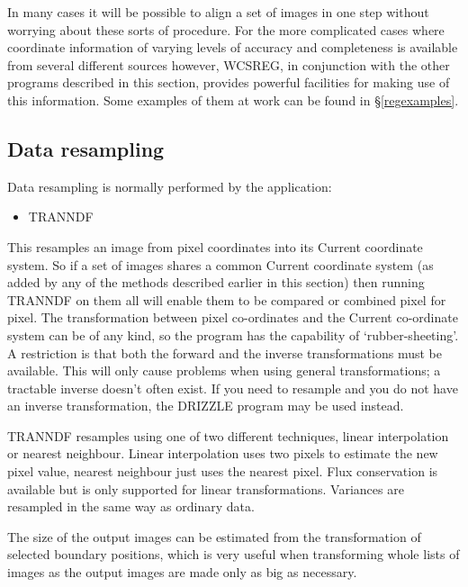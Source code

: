\documentclass[twoside,11pt]{article}
\newcommand{\hyperref}[4]{#2\ref{#4}#3}
\newcommand{\htmlref}[2]{#1}
\newcommand{\xlabel}[1]{}
\renewcommand{\_}{\texttt{\symbol{95}}}
\newcommand{\routine}[1]{{\sc #1}}
\newcommand{\xroutine}[1]{\htmlref{{\sc #1}}{#1}}
\begin{document}
In many cases it will be possible to align a set of images in
one step without worrying about these sorts of procedure.
For the more complicated cases where 
coordinate information of varying levels of 
accuracy and completeness is available from several
different sources however,
\routine{WCSREG}, in conjunction with the other programs described
in this section, provides powerful facilities for making use of
this information.  Some examples of them at work can be found
in \hyperref{the examples section}{\S }{}{regexamples}.





\subsection{\xlabel{resampling}\label{resampling}Data resampling}

Data resampling is normally performed by the application:
\begin{itemize}
\item \routine{TRANNDF}
\end{itemize}
This resamples an image from pixel coordinates into
its Current coordinate system.
So if a set of images shares a common Current coordinate system
(as added by any of the methods described earlier in this section)
then running \routine{TRANNDF} on them all will enable them to
be compared or combined pixel for pixel.
The transformation between pixel co-ordinates and the Current
co-ordinate system can be of any kind,
so the program has the capability of `rubber-sheeting'.
A restriction is that both the forward and the inverse transformations
must be available. This will only cause problems when using general
transformations; a tractable inverse doesn't often exist.
If you need to resample and you do not have an inverse transformation, 
the \xroutine{DRIZZLE} program
may be used instead.

\routine{TRANNDF} resamples using 
one of two different techniques, linear interpolation
or nearest neighbour. Linear interpolation uses two pixels to estimate
the new pixel value, nearest neighbour just uses the nearest pixel. Flux
conservation is available but is only supported for linear
transformations. Variances are resampled in the same way as ordinary
data.

The size of the output images can be estimated from the transformation of
selected boundary positions, which is very useful when transforming whole
lists of images as the output images are made only as big as necessary.
\end{document}
